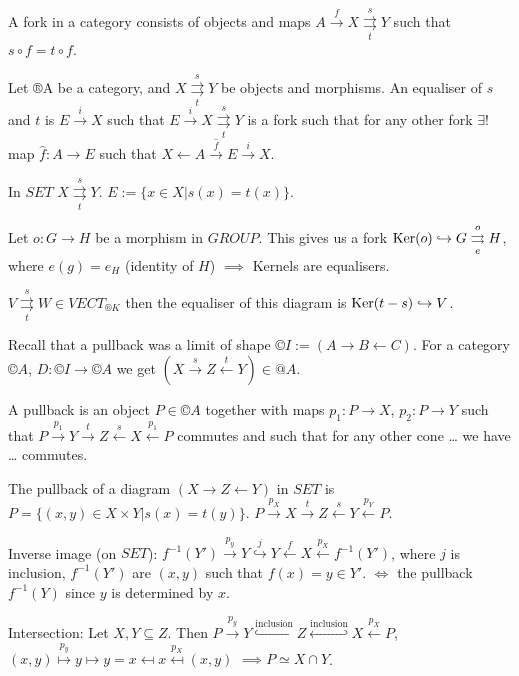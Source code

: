 \documentclass[12pt]{article}					%
\begin{document}
\begin{priklady}[Equalisers]
	A fork in a category consists of objects and maps $A \overset{f}\rightarrow X \overset{s}{\underset{t}\rightrightarrows} Y$ such that $s ∘ f = t ∘ f$.
	\begin{definicein}
		Let ®A be a category, and $X \overset{s}{\underset{t}\rightrightarrows} Y$ be objects and morphisms. An equaliser of $s$ and $t$ is $E \overset{i}\rightarrow X$ such that $E \overset{i}\rightarrow X \overset{s}{\underset{t}\rightrightarrows} Y$ is a fork such that for any other fork $\exists!$ map $\hat{f}: A \rightarrow E$ such that $X \leftarrow A \overset{\hat{f}}\rightarrow E \overset{i}\rightarrow X$.
	\end{definicein}
\end{priklady}

\begin{priklady}
	In $SET$ $X \overset{s}{\underset{t}\rightrightarrows}Y$. $E := \{x \in X | s(x) = t(x)\}$.

	Let $o: G \rightarrow H$ be a morphism in $GROUP$. This gives us a fork $\operatorname{Ker}(o) \hookrightarrow G \overset{o}{\underset{e}\rightrightarrows} H$, where $e(g) = e_H$ (identity of $H$) $\implies$ Kernels are equalisers.

	$V \overset{s}{\underset{t}\rightrightarrows} W \in VECT_{®K}$ then the equaliser of this diagram is $\operatorname{Ker}(t - s) \hookrightarrow V$.
\end{priklady}

\begin{poznamka}[Pullbacks]
	Recall that a pullback was a limit of shape $©I := (A \rightarrow B \leftarrow C)$. For a category $©A$, $D: ©I \rightarrow ©A$ we get $(X \overset{s}\rightarrow Z \overset{t}\leftarrow Y) \in @A$.

	A pullback is an object $P \in ©A$ together with maps $p_1: P \rightarrow X$, $p_2: P \rightarrow Y$ such that $P \overset{p_1}\rightarrow Y \overset{t}\rightarrow Z \overset{s}\leftarrow X \overset{p_1}\leftarrow P$ commutes and such that for any other cone … we have … commutes.
\end{poznamka}

\begin{priklady}
	The pullback of a diagram $(X \rightarrow Z \leftarrow Y)$ in $SET$ is $P = \{(x, y) \in X \times Y | s(x) = t(y)\}$. $P \overset{p_X}\rightarrow X \overset{t}\rightarrow Z \overset{s}\leftarrow Y \overset{p_Y}\leftarrow P$.

	Inverse image (on $SET$): $f^{-1}(Y') \overset{p_y}\rightarrow Y \overset{j}\hookrightarrow Y \overset{f}\leftarrow X \overset{p_X}\leftarrow f^{-1}(Y')$, where $j$ is inclusion, $f^{-1}(Y')$ are $(x, y)$ such that $f(x) = y \in Y'$. $\Leftrightarrow$ the pullback $f^{-1}(Y)$ since $y$ is determined by $x$.

	Intersection: Let $X, Y \subseteq Z$. Then $P \overset{p_y}\rightarrow Y \overset{\text{inclusion}}\hookrightarrow Z \overset{\text{inclusion}}\hookleftarrow X \overset{p_X}\leftarrow P$, $(x, y) \overset{p_y}\mapsto y \mapsto y = x \mapsfrom x \overset{p_X}\mapsfrom (x, y)$ $\implies P \simeq X \cap Y$.
\end{priklady}
\end{document}
